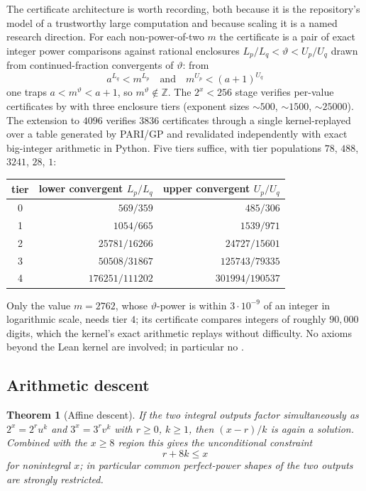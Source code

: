 \documentclass[11pt,oneside]{article}
\newtheorem{theorem}{Theorem}[section]
\theoremstyle{definition}
\theoremstyle{remark}
\newcommand{\Z}{\mathbb Z}
\newcommand{\thetaq}{\vartheta}
\newcommand{\lean}[1]{\texttt{\detokenize{#1}}}
\begin{document}
The certificate architecture is worth recording, both because it is the repository's model
of a trustworthy large computation and because scaling it is a named research direction.
For each non-power-of-two $m$ the certificate is a pair of exact integer power comparisons
against rational enclosures $L_p/L_q<\thetaq<U_p/U_q$ drawn from continued-fraction
convergents of $\thetaq$: from
\[
a^{L_q}<m^{L_p}
\quad\text{and}\quad
m^{U_p}<(a+1)^{U_q}
\]
one traps $a<m^{\thetaq}<a+1$, so $m^{\thetaq}\notin\Z$.  The $2^x<256$ stage verifies
per-value certificates by \lean{norm_num} with three enclosure tiers (exponent sizes
${\sim}500$, ${\sim}1500$, ${\sim}25000$).  The extension to $4096$ verifies $3836$
certificates through a single kernel-replayed \lean{decide} over a table generated by
PARI/GP and revalidated independently with exact big-integer arithmetic in Python.  Five
tiers suffice, with tier populations $78$, $488$, $3241$, $28$, $1$:

\begin{center}
\small
\begin{tabular}{@{}crr@{}}
\toprule
tier & lower convergent $L_p/L_q$ & upper convergent $U_p/U_q$ \\
\midrule
0 & $569/359$ & $485/306$ \\
1 & $1054/665$ & $1539/971$ \\
2 & $25781/16266$ & $24727/15601$ \\
3 & $50508/31867$ & $125743/79335$ \\
4 & $176251/111202$ & $301994/190537$ \\
\bottomrule
\end{tabular}
\end{center}

Only the value $m=2762$, whose $\thetaq$-power is within $3\cdot10^{-9}$ of an integer in
logarithmic scale, needs tier $4$; its certificate compares integers of roughly $90{,}000$
digits, which the kernel's exact arithmetic replays without difficulty.  No axioms beyond
the Lean kernel are involved; in particular no \lean{native_decide}.

\subsection{Arithmetic descent}
\label{sec:descent}

\begin{theorem}[Affine descent]
\label{thm:descent}
If the two integral outputs factor simultaneously as $2^x=2^ru^k$ and $3^x=3^rv^k$ with
$r\ge0$, $k\ge1$, then $(x-r)/k$ is again a solution.  Combined with the $x\ge8$ region this
gives the unconditional constraint
\[
r+8k\le x
\]
for nonintegral $x$; in particular common perfect-power shapes of the two outputs are
strongly restricted.
\end{theorem}
\end{document}
